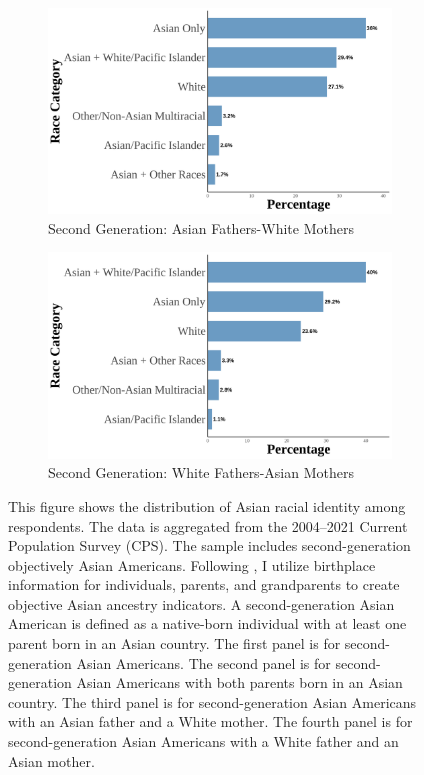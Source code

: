 \begin{landscape}
\begin{figure}[!htb]
\begin{subfigure}{.48\textwidth}
\caption{Second Generation: Asian Fathers-White Mothers}
\centering
\includegraphics[width=1\linewidth]{histogram_asian_american_race_secondgen_AW.png}
\end{subfigure}
\hfill
\begin{subfigure}{.48\textwidth}
\caption{Second Generation: White Fathers-Asian Mothers}
\centering
\includegraphics[width=1\linewidth]{histogram_asian_american_race_secondgen_WA.png}
\end{subfigure}

\caption*{\footnotesize{This figure shows the distribution of Asian racial identity among respondents. 
The data is aggregated from the 2004--2021 Current Population Survey (CPS). 
The sample includes second-generation objectively Asian Americans.
Following \textcite{antmanEthnicAttritionObserved2016,antmanEthnicAttritionAssimilation2020}, 
I utilize birthplace information for individuals, parents, and grandparents to create objective Asian ancestry indicators.
A second-generation Asian American is defined as a native-born individual with at least one parent born in an Asian country. 
The first panel is for second-generation Asian Americans. The second panel is for second-generation Asian Americans with both parents born in an Asian country. 
The third panel is for second-generation Asian Americans with an Asian father and a White mother. 
The fourth panel is for second-generation Asian Americans with a White father and an Asian mother.
}}
\end{figure}
\end{landscape}

